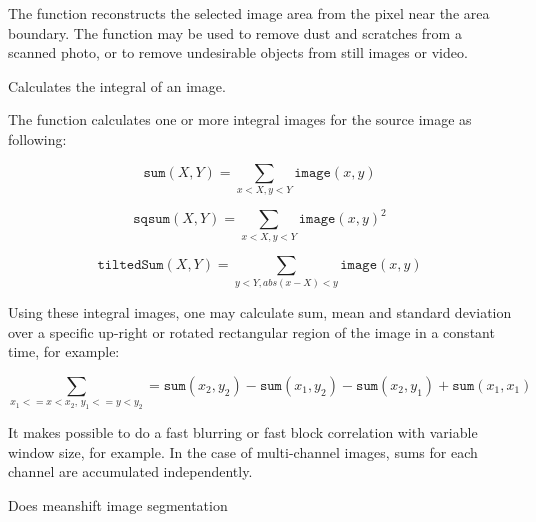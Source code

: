 The function reconstructs the selected image area from the pixel near the area boundary. The function may be used to remove dust and scratches from a scanned photo, or to remove undesirable objects from still images or video.

Calculates the integral of an image.


\begin{description}
\end{description}

The function calculates one or more integral images for the source image as following:

\[
\texttt{sum}(X,Y) = \sum_{x<X,y<Y} \texttt{image}(x,y)
\]

\[
\texttt{sqsum}(X,Y) = \sum_{x<X,y<Y} \texttt{image}(x,y)^2
\]

\[
\texttt{tiltedSum}(X,Y) = \sum_{y<Y,abs(x-X)<y} \texttt{image}(x,y)
\]

Using these integral images, one may calculate sum, mean and standard deviation over a specific up-right or rotated rectangular region of the image in a constant time, for example:

\[
\sum_{x_1<=x<x_2, \, y_1<=y<y_2} = \texttt{sum}(x_2,y_2)-\texttt{sum}(x_1,y_2)-\texttt{sum}(x_2,y_1)+\texttt{sum}(x_1,x_1)
\]

It makes possible to do a fast blurring or fast block correlation with variable window size, for example. In the case of multi-channel images, sums for each channel are accumulated independently.


Does meanshift image segmentation


